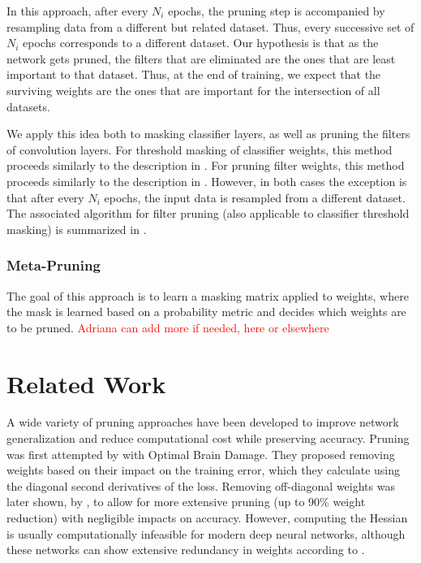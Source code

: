 \documentclass{article}
\begin{document}
In this approach, after every $N_i$ epochs, the pruning step is accompanied by resampling data from a different but related dataset. Thus, every successive set of $N_i$ epochs corresponds to a different dataset. Our hypothesis is that as the network gets pruned, the filters that are eliminated are the ones that are least important to that dataset. Thus, at the end of training, we expect that the surviving weights are the ones that are important for the intersection of all datasets.

We apply this idea both to masking classifier layers, as well as pruning the filters of convolution layers.
For threshold masking of classifier weights, this method proceeds similarly to the description in .
For pruning filter weights, this method proceeds similarly to the description in . However, in both cases the exception is that after every $N_i$ epochs, the input data is resampled from a different dataset. The associated algorithm for filter pruning (also applicable to classifier threshold masking) is summarized in .

\subsubsection{Meta-Pruning} \label{metaPruneClass}

The goal of this approach is to learn a masking matrix applied to weights, where the mask is learned based on a probability metric and decides which weights are to be pruned. \textcolor{red}{Adriana can add more if needed, here or elsewhere} 



\section{Related Work}

A wide variety of pruning approaches have been developed to improve network generalization and reduce computational cost while preserving accuracy. Pruning was first attempted by \citet{OBD} with Optimal Brain Damage. They proposed removing weights based on their impact on the training error, which they calculate using the diagonal second derivatives of the loss. Removing off-diagonal weights was later shown, by \citet{OBS}, to allow for more extensive pruning (up to $90$\% weight reduction) with negligible impacts on accuracy. However, computing the Hessian is usually computationally infeasible for modern deep neural networks, although these networks can show extensive redundancy in weights according to \citet{pred}.
\end{document}
